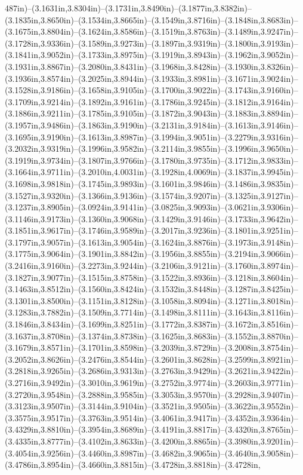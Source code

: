 487in)--(3.1631in,3.8304in)--(3.1731in,3.8490in)--(3.1877in,3.8382in)--(3.1835in,3.8650in)--(3.1534in,3.8665in)--(3.1549in,3.8716in)--(3.1848in,3.8683in)--(3.1675in,3.8804in)--(3.1624in,3.8586in)--(3.1519in,3.8763in)--(3.1489in,3.9247in)--(3.1728in,3.9336in)--(3.1589in,3.9273in)--(3.1897in,3.9319in)--(3.1800in,3.9193in)--(3.1841in,3.9052in)--(3.1733in,3.8975in)--(3.1919in,3.8943in)--(3.1962in,3.9052in)--(3.1931in,3.8867in)--(3.2080in,3.8431in)--(3.1968in,3.8428in)--(3.1930in,3.8326in)--(3.1936in,3.8574in)--(3.2025in,3.8944in)--(3.1933in,3.8981in)--(3.1671in,3.9024in)--(3.1528in,3.9186in)--(3.1658in,3.9105in)--(3.1700in,3.9022in)--(3.1743in,3.9160in)--(3.1709in,3.9214in)--(3.1892in,3.9161in)--(3.1786in,3.9245in)--(3.1812in,3.9164in)--(3.1886in,3.9211in)--(3.1785in,3.9105in)--(3.1872in,3.9043in)--(3.1883in,3.8894in)--(3.1957in,3.9486in)--(3.1863in,3.9190in)--(3.2131in,3.9184in)--(3.1613in,3.9146in)--(3.1695in,3.9190in)--(3.1613in,3.8987in)--(3.1994in,3.9051in)--(3.2279in,3.9316in)--(3.2032in,3.9319in)--(3.1996in,3.9582in)--(3.2114in,3.9855in)--(3.1996in,3.9650in)--(3.1919in,3.9734in)--(3.1807in,3.9766in)--(3.1780in,3.9735in)--(3.1712in,3.9833in)--(3.1664in,3.9711in)--(3.2010in,4.0031in)--(3.1928in,4.0069in)--(3.1837in,3.9945in)--(3.1698in,3.9818in)--(3.1745in,3.9893in)--(3.1601in,3.9846in)--(3.1486in,3.9835in)--(3.1527in,3.9320in)--(3.1366in,3.9136in)--(3.1574in,3.9207in)--(3.1325in,3.9127in)--(3.1237in,3.8905in)--(3.0924in,3.9141in)--(3.0825in,3.9093in)--(3.0621in,3.9306in)--(3.1146in,3.9173in)--(3.1360in,3.9068in)--(3.1429in,3.9146in)--(3.1733in,3.9642in)--(3.1851in,3.9617in)--(3.1746in,3.9589in)--(3.2017in,3.9236in)--(3.1801in,3.9251in)--(3.1797in,3.9057in)--(3.1613in,3.9054in)--(3.1624in,3.8876in)--(3.1973in,3.9148in)--(3.1775in,3.9064in)--(3.1901in,3.8842in)--(3.1956in,3.8855in)--(3.2194in,3.9066in)--(3.2416in,3.9160in)--(3.2273in,3.9244in)--(3.2106in,3.9121in)--(3.1760in,3.8974in)--(3.1827in,3.9077in)--(3.1515in,3.8758in)--(3.1522in,3.8936in)--(3.1218in,3.8604in)--(3.1463in,3.8512in)--(3.1560in,3.8424in)--(3.1532in,3.8448in)--(3.1287in,3.8425in)--(3.1301in,3.8500in)--(3.1151in,3.8128in)--(3.1058in,3.8094in)--(3.1271in,3.8018in)--(3.1283in,3.7882in)--(3.1509in,3.7714in)--(3.1498in,3.8111in)--(3.1643in,3.8116in)--(3.1846in,3.8434in)--(3.1699in,3.8251in)--(3.1772in,3.8387in)--(3.1672in,3.8516in)--(3.1637in,3.8708in)--(3.1374in,3.8738in)--(3.1625in,3.8683in)--(3.1552in,3.8870in)--(3.1679in,3.8571in)--(3.1701in,3.8598in)--(3.2039in,3.8729in)--(3.2008in,3.8754in)--(3.2052in,3.8626in)--(3.2476in,3.8544in)--(3.2601in,3.8628in)--(3.2599in,3.8921in)--(3.2818in,3.9265in)--(3.2686in,3.9313in)--(3.2763in,3.9429in)--(3.2621in,3.9422in)--(3.2716in,3.9492in)--(3.3010in,3.9619in)--(3.2752in,3.9774in)--(3.2603in,3.9771in)--(3.2720in,3.9548in)--(3.2888in,3.9585in)--(3.3053in,3.9570in)--(3.2928in,3.9407in)--(3.3123in,3.9507in)--(3.3144in,3.9104in)--(3.3521in,3.9505in)--(3.3622in,3.9552in)--(3.3575in,3.9517in)--(3.3763in,3.9514in)--(3.4061in,3.9417in)--(3.4352in,3.9364in)--(3.4329in,3.8810in)--(3.3954in,3.8689in)--(3.4191in,3.8817in)--(3.4320in,3.8765in)--(3.4335in,3.8777in)--(3.4102in,3.8633in)--(3.4200in,3.8865in)--(3.3980in,3.9201in)--(3.4054in,3.9256in)--(3.4460in,3.8987in)--(3.4682in,3.9065in)--(3.4640in,3.9058in)--(3.4786in,3.8954in)--(3.4660in,3.8815in)--(3.4728in,3.8818in)--(3.4728in,